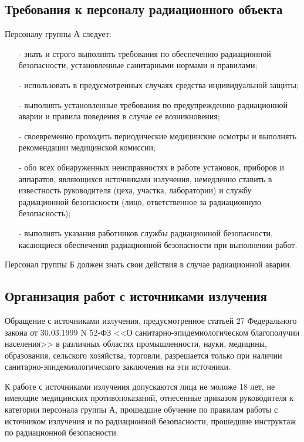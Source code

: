 \subsection{Требования к персоналу радиационного объекта} 
\label{subsect1_1_3}
	Персоналу группы А следует:
	\begin{itemize}
		\item[-] знать и строго выполнять требования по обеспечению радиационной 
			безопасности, установленные санитарными нормами и правилами;
		\item[-] использовать в предусмотренных случаях средства индивидуальной 
			защиты;
		\item[-] выполнять установленные требования по предупреждению радиационной 
			аварии и правила поведения в случае ее возникновения;
		\item[-] своевременно проходить периодические медицинские осмотры и 
			выполнять рекомендации медицинской комиссии;
		\item[-] обо всех обнаруженных неисправностях в работе установок, приборов 
			и аппаратов, являющихся источниками излучения, немедленно ставить 
			в известность руководителя (цеха, участка, лаборатории) и службу 
			радиационной безопасности (лицо, ответственное за радиационную 
			безопасность);
		\item[-] выполнять указания работников службы радиационной безопасности, 
			касающиеся обеспечения радиационной безопасности при выполнении работ.
	\end{itemize}

	Персонал группы Б должен знать свои действия в случае радиационной аварии.

\subsection{Организация работ с источниками излучения} \label{subsect1_1_4}
	Обращение с источниками излучения, предусмотренное статьей 27 
	Федерального закона от 30.03.1999 N 52-ФЗ <<О санитарно-эпидемиологическом 
	благополучии населения>> в различных областях промышленности, науки, 
	медицины, образования, сельского хозяйства, торговли, разрешается только 
	при наличии санитарно-эпидемиологического заключения на эти источники.

	К работе с источниками излучения допускаются лица не моложе 18 лет, не 
	имеющие медицинских противопоказаний, отнесенные приказом руководителя к 
	категории персонала группы А, прошедшие обучение по правилам работы с 
	источником излучения и по радиационной безопасности, прошедшие инструктаж 
	по радиационной безопасности.

